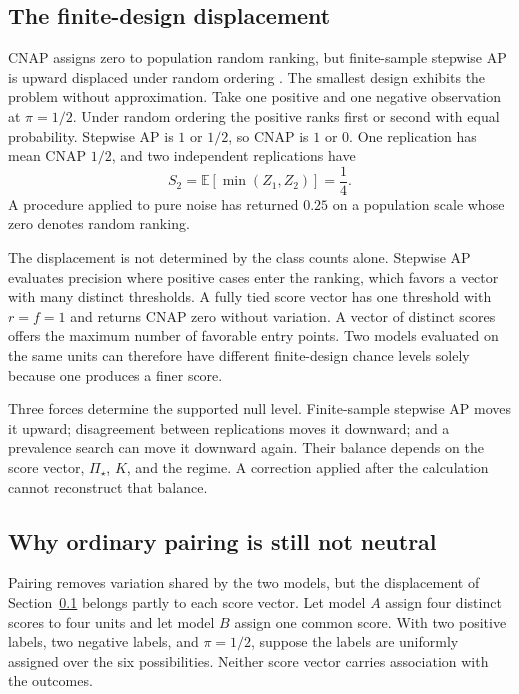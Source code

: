 \documentclass[11pt]{article}
\newcommand{\PSet}{\Pi_\star}
\newcommand{\E}{\mathbb{E}}
\theoremstyle{remark}
\begin{document}
\subsection{The finite-design displacement}
\label{sec:displacement}

CNAP assigns zero to population random ranking, but finite-sample stepwise AP is upward displaced under random ordering \cite{bestgen2015random}. The smallest design exhibits the problem without approximation. Take one positive and one negative observation at $\pi=1/2$. Under random ordering the positive ranks first or second with equal probability. Stepwise AP is $1$ or $1/2$, so CNAP is $1$ or $0$. One replication has mean CNAP $1/2$, and two independent replications have
\[
S_2
=
\E[\min(Z_1,Z_2)]
=
\frac14.
\]
A procedure applied to pure noise has returned $0.25$ on a population scale whose zero denotes random ranking.

The displacement is not determined by the class counts alone. Stepwise AP evaluates precision where positive cases enter the ranking, which favors a vector with many distinct thresholds. A fully tied score vector has one threshold with $r=f=1$ and returns CNAP zero without variation. A vector of distinct scores offers the maximum number of favorable entry points. Two models evaluated on the same units can therefore have different finite-design chance levels solely because one produces a finer score.

Three forces determine the supported null level. Finite-sample stepwise AP moves it upward; disagreement between replications moves it downward; and a prevalence search can move it downward again. Their balance depends on the score vector, $\PSet$, $K$, and the regime. A correction applied after the calculation cannot reconstruct that balance.

\subsection{Why ordinary pairing is still not neutral}

Pairing removes variation shared by the two models, but the displacement of Section~\ref{sec:displacement} belongs partly to each score vector. Let model $A$ assign four distinct scores to four units and let model $B$ assign one common score. With two positive labels, two negative labels, and $\pi=1/2$, suppose the labels are uniformly assigned over the six possibilities. Neither score vector carries association with the outcomes.
\end{document}
